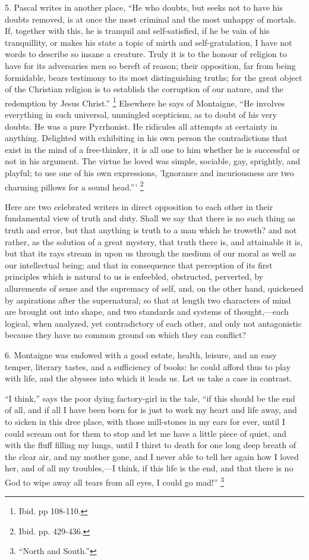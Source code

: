 5. Pascal writes in another place, ``He who doubts, but seeks
not to have his doubts removed, is at once the most criminal and the
most unhappy of mortals. If, together with this, he is tranquil and
self-satisfied, if he be vain of his tranquillity, or makes his state
a topic of mirth and self-gratulation, I have not words to describe
so insane a creature. Truly it is to the honour of religion to
have for its adversaries men so bereft of reason; their opposition,
far from being formidable, bears testimony to its most distinguishing
truths; for the great object of the Christian religion is to establish
the corruption of our nature, and the redemption by Jesus
Christ.'' \footnote{Ibid. pp
108-110.} Elsewhere
he says of Montaigne, ``He involves everything in such universal,
unmingled scepticism, as to doubt of his very doubts. He was a pure
Pyrrhonist. He ridicules all attempts at certainty in anything.
Delighted with exhibiting in his own person the contradictions that
exist in the mind of a free-thinker, it is all one to him whether he
is successful or not in his argument. The virtue he loved was simple,
sociable, gay, sprightly, and playful; to use one of his own
expressions, 'Ignorance and incuriousness are two charming pillows for
a sound head.''' \footnote{Ibid. pp.
429-436.}

Here are two celebrated writers in direct opposition to each other
in their fundamental view of truth and duty. Shall we say that there
is no such thing as truth and error, but that anything is truth to a
man which he troweth? and not rather, as the solution of a great
mystery, that truth there is, and attainable it is, but that its rays
stream in upon us through the medium of our moral as well as our
intellectual being; and that in consequence that perception of its
first principles which is natural to us is enfeebled, obstructed,
perverted, by allurements of sense and the supremacy of self, and, on
the other hand, quickened by aspirations after the supernatural; so
that at length two characters of mind are brought out into
shape, and two standards and systems of thought,—each logical, when
analyzed, yet contradictory of each other, and only not antagonistic
because they have no common ground on which they can conflict?

6. Montaigne was endowed with a good estate, health, leisure, and
an easy temper, literary tastes, and a sufficiency of books: he could
afford thus to play with life, and the abysses into which it leads us.
Let us take a case in contrast.

``I think,'' says the poor dying factory-girl in the tale,
``if this should be the end of all, and if all I have been born
for is just to work my heart and life away, and to sicken in this dree
place, with those mill-stones in my ears for ever, until I could
scream out for them to stop and let me have a little piece of quiet,
and with the fluff filling my lungs, until I thirst to death for one
long deep breath of the clear air, and my mother gone, and I never
able to tell her again how I loved her, and of all my troubles,—I
think, if this life is the end, and that there is no God to wipe away
all tears from all eyes, I could go mad!'' \footnote{``North and
South.''}

